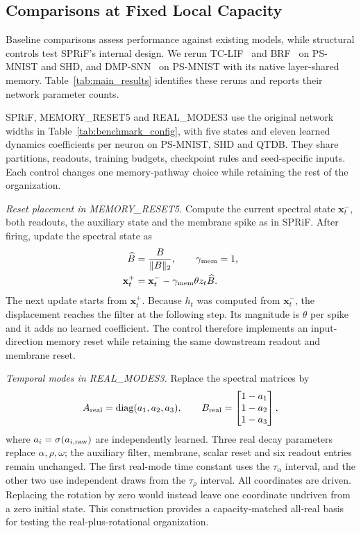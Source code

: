 \documentclass[letterpaper,journal]{IEEEtran}
\newcommand{\mr}{\textnormal{MEMORY\_RESET5}}
\newcommand{\rmodes}{\textnormal{REAL\_MODES3}}
\DeclareMathOperator{\diag}{diag}
\begin{document}
\subsection{Comparisons at Fixed Local Capacity}
\label{sec:controls}
\label{sec:baselines}

Baseline comparisons assess performance against existing models, while structural controls test SPRiF's internal design. We rerun TC-LIF~\cite{tclif} and BRF~\cite{brf} on PS-MNIST and SHD, and DMP-SNN~\cite{sun2026dmp} on PS-MNIST with its native layer-shared memory. Table~\ref{tab:main_results} identifies these reruns and reports their network parameter counts.

SPRiF, \mr{} and \rmodes{} use the original network widths in Table~\ref{tab:benchmark_config}, with five states and eleven learned dynamics coefficients per neuron on PS-MNIST, SHD and QTDB. They share partitions, readouts, training budgets, checkpoint rules and seed-specific inputs. Each control changes one memory-pathway choice while retaining the rest of the organization.

\noindent\textit{Reset placement in \mr.}
Compute the current spectral state $\mathbf x_t^-$, both readouts, the auxiliary state and the membrane spike as in SPRiF. After firing, update the spectral state as
\begin{equation}
\begin{aligned}
\widehat B&=\frac{B}{\|B\|_2},\qquad \gamma_{\rm mem}=1,\\
\mathbf x_t^+&=\mathbf x_t^--\gamma_{\rm mem}\theta z_t\widehat B.
\end{aligned}
\label{eq:memory_reset_control}
\end{equation}
The next update starts from $\mathbf x_t^+$. Because $h_t$ was computed from $\mathbf x_t^-$, the displacement reaches the filter at the following step. Its magnitude is $\theta$ per spike and it adds no learned coefficient. The control therefore implements an input-direction memory reset while retaining the same downstream readout and membrane reset.

\noindent\textit{Temporal modes in \rmodes.}
Replace the spectral matrices by
\begin{equation}
A_{\rm real}=\diag(a_1,a_2,a_3),\qquad
B_{\rm real}=\begin{bmatrix}1-a_1\\1-a_2\\1-a_3\end{bmatrix},
\label{eq:real_control}
\end{equation}
where $a_i=\sigma(a_{i,\rm raw})$ are independently learned. Three real decay parameters replace $\alpha,\rho,\omega$; the auxiliary filter, membrane, scalar reset and six readout entries remain unchanged. The first real-mode time constant uses the $\tau_\alpha$ interval, and the other two use independent draws from the $\tau_\rho$ interval. All coordinates are driven. Replacing the rotation by zero would instead leave one coordinate undriven from a zero initial state. This construction provides a capacity-matched all-real basis for testing the real-plus-rotational organization.
\end{document}
